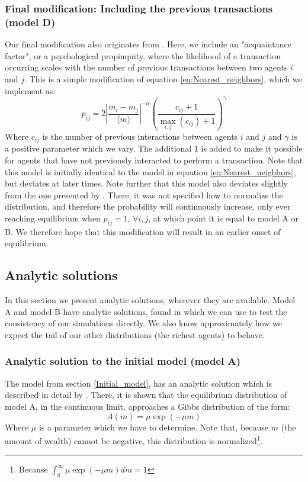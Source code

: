 \documentclass[a4paper, 10pt]{article}
\begin{document}
\subsubsection{Final modification: Including the previous transactions (model D)}\label{Model_D}
Our final modification also originates from \cite{AgentBased}. Here, we include an "acquaintance factor", or a psychological propinquity, where the likelihood of a transaction occurring scales with the number of previous transactions between two agents $i$ and $j$. This is a simple modification of equation \ref{eq:Nearest_neighbors}, which we implement as:
\begin{equation}\label{eq:nearest_with_previous_transactions}
p_{ij}=2\left|\frac{m_i-m_j}{\langle m \rangle} \right|^{-\alpha}\left(\frac{c_{ij}+1}{\max_{i,j} (c_{ij})+1}\right)^{\gamma}
\end{equation} 
Where $c_{ij}$ is the number of previous interactions between agents $i$ and $j$ and $\gamma$ is a positive parameter which we vary. The additional $1$ is added to make it possible for agents that have not previously interacted to perform a transaction. Note that this model is initially identical to the model in equation \ref{eq:Nearest_neighbors}, but deviates at later times. Note further that this model also deviates slightly from the one presented by \cite{AgentBased}. There, it was not specified how to normalize the distribution, and therefore the probability will continuously increase, only ever reaching equilibrium when $p_{ij}=1$, $\forall i,j$, at which point it is equal to model A or B. We therefore hope that this modification will result in an earlier onset of equilibrium.
\subsection{Analytic solutions}\label{Analytic_solution}
In this section we present analytic solutions, wherever they are available. Model A and model B have analytic solutions, found in \cite{Gibbs} which we can use to test the consistency of our simulations directly. We also know approximately how we expect the tail of our other distributions (the richest agents) to behave.
\subsubsection{Analytic solution to the initial model (model A)}
The model from section \ref{Initial_model}, has an analytic solution which is described in detail by \cite{Gibbs}. There, it is shown that the equilibrium distribution of model A, in the continuous limit, approaches a Gibbs distribution of the form:
\begin{equation}\label{eq:Analytic_solution_A}
A(m)=\mu \exp(-\mu m)
\end{equation}
Where $\mu$ is a parameter which we have to determine. Note that, because $m$ (the amount of wealth) cannot be negative, this distribution is normalized\footnote{Because $\int_0^{\infty} \mu \exp(-\mu m)dm=1$}.
\end{document}
